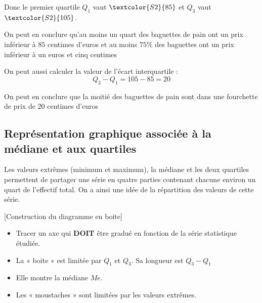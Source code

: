 \begin{ex}{}{}
\noindent Donc le premier quartile $Q_{1}$ vaut $\textcolor{S2}{85}$ et $Q_{3}$ vaut $\textcolor{S2}{105}$. 

\noindent On peut en conclure qu'au moins un quart des baguettes de pain ont un prix inférieur à $85$ centimes d'euros et au moins $75\%$ des baguettes ont un prix inférieur à un euros et cinq centimes
\medskip

\noindent On peut aussi calculer la valeur de l'écart interquartile :
\[Q_{3} - Q_{1} = 105 - 85 = 20\] 

\noindent On peut en conclure que la moitié des baguettes de pain sont dans une fourchette de prix de $20$ centimes d'euros

\end{ex}

\subsection{Représentation graphique associée à la médiane et aux quartiles}

Les valeurs extrêmes (minimum et maximum), la médiane et les deux quartiles permettent de partager une série en quatre parties contenant chacune environ un quart de l'effectif total. On a ainsi une idée de la répartition des valeurs de cette série.

\begin{methode}{}{}[Construction du diagramme en boite]
\begin{itemize}
\item  Tracer un axe qui \textbf{DOIT} être gradué en fonction de la série statistique étudiée.
\item  La « boite » est limitée par $Q_{1}$ et $Q_{3}$. Sa longueur est $Q_{3} - Q_{1}$
\item  Elle montre la médiane $Me$.
\item  Les « moustaches » sont limitées par les valeurs extrêmes.
\end{itemize}
\bigbreak

\end{methode}

